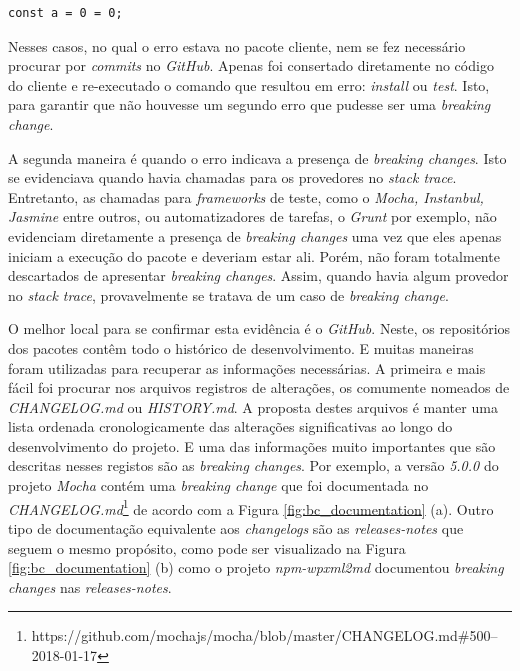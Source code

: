 \begin{lstlisting}[style=Javascript, label=cod:syntax:error, caption={Código com um Reference Error}]
const a = 0 = 0;
\end{lstlisting}

Nesses casos, no qual o erro estava no pacote cliente, nem se fez necessário procurar por \textit{commits} no \textit{GitHub}. Apenas foi consertado diretamente no código do cliente e re-executado o comando que resultou em erro: \textit{install} ou \textit{test}. Isto, para garantir que não houvesse um segundo erro que pudesse ser uma \textit{breaking change}.

A segunda maneira é quando o erro indicava a presença de \textit{breaking changes}. Isto se evidenciava quando havia chamadas para os provedores no \textit{stack trace}. Entretanto, as chamadas para \textit{frameworks} de teste, como o \textit{Mocha, Instanbul, Jasmine} entre outros, ou automatizadores de tarefas, o \textit{Grunt} por exemplo, não evidenciam diretamente a presença de \textit{breaking changes} uma vez que eles apenas iniciam a execução do pacote e deveriam estar ali. Porém, não foram totalmente descartados de apresentar \textit{breaking changes}. Assim, quando havia algum provedor no \textit{stack trace}, provavelmente se tratava de um caso de \textit{breaking change}.

O melhor local para se confirmar esta evidência é o \textit{GitHub}. Neste, os repositórios dos pacotes contêm todo o histórico de desenvolvimento. E muitas maneiras foram utilizadas para recuperar as informações necessárias. A primeira e mais fácil foi procurar nos arquivos registros de alterações, os comumente nomeados de \textit{CHANGELOG.md} ou \textit{HISTORY.md}. A proposta destes arquivos é manter uma lista ordenada cronologicamente das alterações significativas ao longo do desenvolvimento do projeto. E uma das informações muito importantes que são descritas nesses registos são as \textit{breaking changes}. Por exemplo, a versão \textit{5.0.0} do projeto \textit{Mocha} contém uma \textit{breaking change} que foi documentada no \textit{CHANGELOG.md}\footnote{https://github.com/mochajs/mocha/blob/master/CHANGELOG.md\#500--2018-01-17} de acordo com a Figura \ref{fig:bc_documentation} (a). Outro tipo de documentação equivalente aos \textit{changelogs} são as \textit{releases-notes} que seguem o mesmo propósito, como pode ser visualizado na Figura \ref{fig:bc_documentation} (b) como o projeto \textit{npm-wpxml2md} documentou \textit{breaking changes} nas \textit{releases-notes}.

